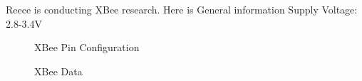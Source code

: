 \documentclass[fontsize=11pt, %
                             paper=letter, %
                             twoside, %
                             captions=tableheading,
                             index=totoc,
                             hyperref]{labbook}
\begin{document}
Reece is conducting XBee research. Here is General information
\newline Supply Voltage: 2.8-3.4V
\begin{figure}
  \centering
  \caption{XBee Pin Configuration}
  \label{fig:XBeePinConfig}
\end{figure}

\begin{figure}
  \centering
  \caption{XBee Data}
  \label{fig:XBeeData}
\end{figure}
\end{document}
